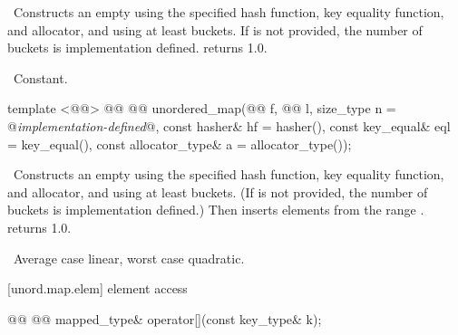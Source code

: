 \documentclass[american,twoside]{book}
\begin{document}
\begin{itemdescr}
\pnum
\effects\ Constructs an empty  using the
specified hash function, key equality function, and allocator, and
using at least \textit{} buckets.  If \textit{} is not
provided, the number of buckets is implementation defined.
 returns 1.0.

\pnum
\complexity\ Constant.
\end{itemdescr}

%
\begin{itemdecl}
template <@@>
  @@
          @@
  unordered_map(@@ f, @@ l,
                size_type n = @\textit{implementation-defined}@,
                const hasher& hf = hasher(),
                const key_equal& eql = key_equal(),
                const allocator_type& a = allocator_type());
\end{itemdecl}

\begin{itemdescr}
\pnum
\effects\ Constructs an empty  using the
specified hash function, key equality function, and allocator, and
using at least \textit{} buckets.  (If \textit{} is not
provided, the number of buckets is implementation defined.)  Then
inserts elements from the range \tcode{[\textit{f}, \textit{l})}.
 returns 1.0.

\pnum
\complexity\ Average case linear, worst case quadratic.
\end{itemdescr}

[unord.map.elem]{ element access}

%
%
%
\begin{itemdecl}
@@
      @@
  mapped_type& operator[](const key_type& k);
\end{itemdecl}
\end{document}
